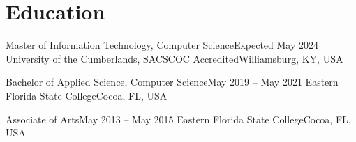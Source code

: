 \section{Education}
\mySubHeadingListStart

  \mySubHeading
    {Master of Information Technology, Computer Science}{Expected May 2024}
    {University of the Cumberlands, SACSCOC Accredited}{Williamsburg, KY, USA}

  \mySubHeading
    {Bachelor of Applied Science, Computer Science}{May 2019 -- May 2021}
    {Eastern Florida State College}{Cocoa, FL, USA}

  \mySubHeading
    {Associate of Arts}{May 2013 -- May 2015}
    {Eastern Florida State College}{Cocoa, FL, USA}

\mySubHeadingListEnd
